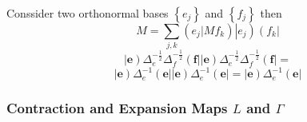 \documentclass[aps,preprint]{revtex4}%
\begin{document}
Conssider two orthonormal bases $\left\{  e_{j}\right\}  $ and $\left\{
f_{j}\right\}  $ then
\begin{equation}
M=\sum_{j,k}\left(  e_{j}\left\vert Mf_{k}\right.  \right)  \left\vert
e_{j}\right)  \left(  f_{k}\right\vert
\end{equation}%
\begin{equation}
\left\vert \mathbf{e}\right)  \Delta_{e}^{-\frac{1}{2}}\Delta_{f}^{-\frac
{1}{2}}\left(  \mathbf{f}\right\vert \left\vert \mathbf{e}\right)  \Delta
_{e}^{-\frac{1}{2}}\Delta_{f}^{-\frac{1}{2}}\left(  \mathbf{f}\right\vert =
\end{equation}%
\begin{equation}
\left\vert \mathbf{e}\right)  \Delta_{e}^{-1}\left(  \mathbf{e}\right\vert
\left\vert \mathbf{e}\right)  \Delta_{e}^{-1}\left(  \mathbf{e}\right\vert
=\left\vert \mathbf{e}\right)  \Delta_{e}^{-1}\left(  \mathbf{e}\right\vert
\end{equation}


\subsubsection{Contraction and Expansion Maps $L$ and $\Gamma$}%
\end{document}
